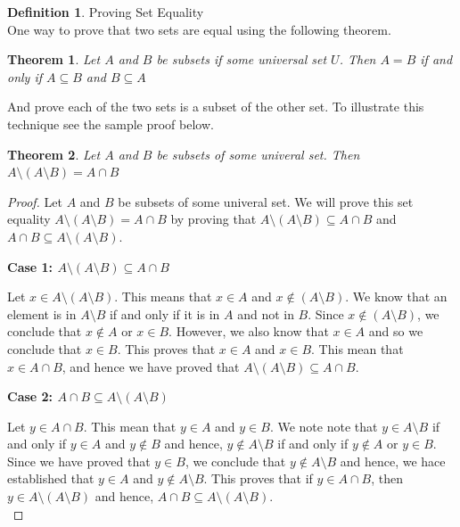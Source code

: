 \documentclass{book}
\newtheorem{theorem}{Theorem}[section]
\theoremstyle{definition}
\newtheorem{definition}{Definition}[section]
\theoremstyle{remark}
\begin{document}
\newpage 
\begin{definition}
Proving Set Equality \\

    One way to prove that two sets are equal using the following theorem. 
        \begin{theorem}
            Let $A$ and $B$ be subsets if some universal set $U$. Then $A = B$ if and only if $A \subseteq B$ and $B \subseteq A$
        \end{theorem}
    And prove each of the two sets is a subset of the other set. To illustrate this technique see the sample proof below. 
    
        \begin{tcolorbox}
            \begin{theorem}
                Let $A$ and $B$ be subsets of some univeral set. Then $A \setminus (A \setminus B) = A \cap B$
            \end{theorem}
        \end{tcolorbox}
        
        \begin{proof}
            Let $A$ and $B$ be subsets of some univeral set. We will prove this set equality $A \setminus (A \setminus B) = A \cap B$ by proving that $A \setminus (A \setminus B) \subseteq A \cap B$ and $A \cap B \subseteq A \setminus (A \setminus B)$. \\
            
            \begin{flushleft} \textbf{Case 1: $A \setminus (A \setminus B) \subseteq A \cap B$} \end{flushleft}
                Let $x \in A \setminus (A \setminus B) $. This means that $x \in A$ and $x \notin (A \setminus B)$. We know that an element is in $A \setminus B$ if and only if it is in $A$ and not in $B$. Since $x \notin (A \setminus B)$, we conclude that $x \notin A$ or $x \in B$. However, we also know that $x \in A$ and so we conclude that $x \in B$. This proves that $x \in A$ and $x \in B$. This mean that $x \in A \cap B$, and hence we have proved that $A \setminus (A \setminus B) \subseteq A \cap B$. \\
            
            \begin{flushleft} \textbf{Case 2: $A \cap B \subseteq A \setminus (A \setminus B)$} \end{flushleft} 
                Let $y \in A \cap B$. This mean that $y \in A$ and $y \in B$. We note note that $y \in A \setminus B$ if and only if $y \in A$ and $y \notin B$ and hence, $y \notin A \setminus B$ if and only if $y \notin A$ or $y \in B$. Since we have proved that $y \in B$, we conclude that $y \notin A \setminus B$ and hence, we hace established that $y \in A$ and $y \notin A \setminus B$. This proves that if $y \in A \cap B$, then $y \in A \setminus (A \setminus B)$ and hence, $A \cap B \subseteq A \setminus (A \setminus B)$. \\
            

\end{proof}
\end{definition}
\end{document}
